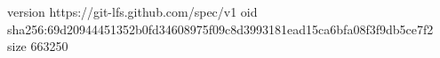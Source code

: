 version https://git-lfs.github.com/spec/v1
oid sha256:69d20944451352b0fd34608975f09c8d3993181ead15ca6bfa08f3f9db5ce7f2
size 663250
